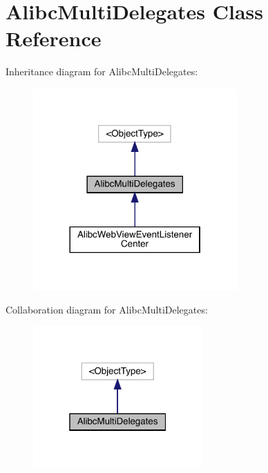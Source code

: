 \hypertarget{interface_alibc_multi_delegates}{}\section{Alibc\+Multi\+Delegates Class Reference}
\label{interface_alibc_multi_delegates}


Inheritance diagram for Alibc\+Multi\+Delegates\+:\nopagebreak
\begin{figure}[H]
\begin{center}
\leavevmode
\includegraphics[width=221pt]{interface_alibc_multi_delegates__inherit__graph}
\end{center}
\end{figure}


Collaboration diagram for Alibc\+Multi\+Delegates\+:\nopagebreak
\begin{figure}[H]
\begin{center}
\leavevmode
\includegraphics[width=184pt]{interface_alibc_multi_delegates__coll__graph}
\end{center}
\end{figure}
